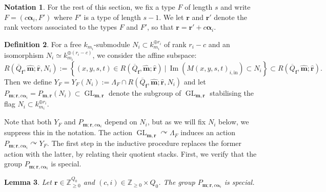 \documentclass[a4paper,12pt]{article}
\theoremstyle{definition}
\newtheorem{definition}{Definition}[section]
\newtheorem{notation}[definition]{Notation}
\theoremstyle{plain}
\newtheorem{lemma}[definition]{Lemma}
\theoremstyle{remark}
\DeclareMathOperator{\GL}{GL}
\DeclareMathOperator{\Ima}{Im}
\newcommand\bbZ{\mathbb{Z}}
\newcommand\bfalpha{\bm{\alpha}}
\newcommand\bff{\mathbf{f}}
\newcommand\bfm{\mathbf{m}}
\newcommand\bfr{\mathbf{r}}
\begin{document}
\begin{notation}\label{not/type and subtype}
For the rest of this section, we fix a type $F$ of length $s$ and write $F = (c\bfalpha_i,F')$ where $F'$ is a type of length $s-1$. We let $\bfr$ and $\bfr'$ denote the rank vectors associated to the types $F$ and $F'$, so that $\bfr = \bfr' + c\bfalpha_i$.
\end{notation}


\begin{definition}\label{def/jetParabolicAction}
For a free $k_{m_i}$-submodule $N_i\subset k_{m_i}^{\oplus r_i}$ of rank $r_i-c$ and an isomorphism $N_i\simeq k_{m_i}^{\oplus (r_i-c)}$, we consider the affine subspace:
\[ R(\overline{Q}_\bff,\widehat{\bfm};\widehat{\bfr},N_i) 
:= \left\{
(x,y,s,t)\in R(\overline{Q}_\bff,\widehat{\bfm};\widehat{\bfr})
\ \vert\ 
\Ima(M(x,y,s,t)_{i,\mathrm{in}})\subset N_i
\right\}  \subset  R(\overline{Q}_\bff,\widehat{\bfm};\widehat{\bfr}).\]
Then we define $Y_F=Y_F(N_i):=\Lambda_F\cap R(\overline{Q}_\bff,\widehat{\bfm};\widehat{\bfr},N_i)$ and
let $P_{\bfm;\bfr,c\bfalpha_i}=P_{\bfm,\bfr}(N_i)\subset\GL_{\bfm,\bfr}$ denote the subgroup of $\GL_{\bfm,\bfr}$ stabilising the flag $N_i\subset k_{m_i}^{\oplus r_i}$. 
\end{definition}

Note that both $Y_F$ and $P_{\bfm;\bfr,c\bfalpha_i}$ depend on $N_i$, but as we will fix $N_i$ below, we suppress this in the notation. The action $\GL_{\bfm,\bfr}\curvearrowright\Lambda_F$ induces an action $P_{\bfm;\bfr,c\bfalpha_i}\curvearrowright Y_F$. The first step in the inductive procedure replaces the former action with the latter, by relating their quotient stacks. First, we verify that the group $P_{\bfm;\bfr,c\bfalpha_i}$ is special.

\begin{lemma}\label{Lem/specialGroups}
Let $\bfr\in\bbZ_{\geq0}^{Q_0}$ and $(c,i)\in\bbZ_{\geq0}\times Q_0$. The group $P_{\bfm;\bfr,c\bfalpha_i}$ is special.
\end{lemma}
\end{document}
